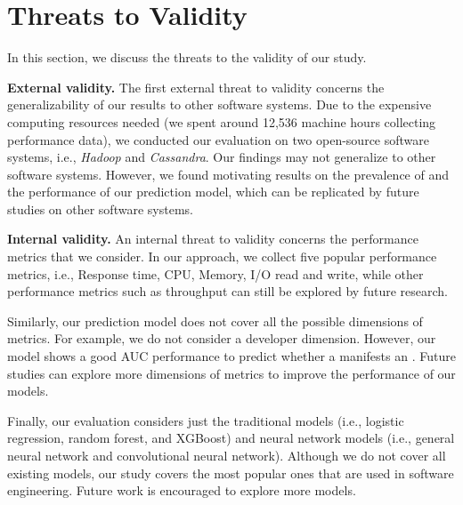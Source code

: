 
\section{Threats to Validity}
\label{sec:threats}
In this section, we discuss the threats to the validity of our study. 

\noindent \textbf{External validity.} The first external threat to validity concerns the generalizability of our results to other software systems. Due to the expensive computing resources needed (we spent around 12,536 machine hours collecting performance data), we conducted our evaluation on two open-source software systems, i.e., \emph{Hadoop} and \emph{Cassandra}. Our findings may not generalize to other software systems. %
However, we found motivating results on the prevalence of \inconsistent and the performance of our prediction model, which can be replicated by future studies on other software systems. %

\noindent \textbf{Internal validity.}
An internal threat to validity concerns the performance metrics that we consider. In our approach, we collect five popular performance metrics, i.e., Response time, CPU, Memory, I/O read and write, while other performance metrics such as throughput can still be explored by future research.%

Similarly, our prediction model does not cover all the possible dimensions of metrics. For example, we do not consider a developer dimension. However, our model shows a good AUC performance to predict whether a \instance manifests an \inconsistent. Future studies can explore more dimensions of metrics to improve the performance of our models. 

Finally, our evaluation considers just the traditional models (i.e., logistic regression, random forest, and XGBoost) and neural network models (i.e., general neural network and convolutional neural network). Although we do not cover all existing models, our study covers the most popular ones that are used in software engineering. Future work is encouraged to explore more models. 



